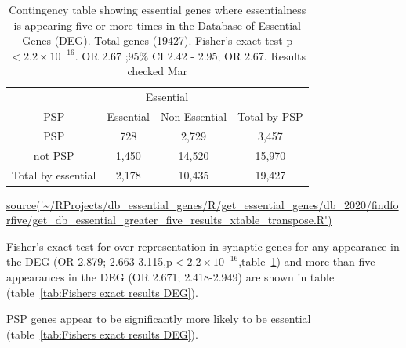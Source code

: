    \begin{table}
\centering
\begin{tabular}{cccc}
\toprule
& \multicolumn{2}{c}{Essential} & \\
\cmidrule{2-3}
    PSP & Essential &  Non-Essential & Total by PSP\vspace{1mm} \\
\midrule 
PSP      &   728     &     2,729 & 3,457\vspace{1mm}\\
not PSP    &  1,450      &    14,520  & 15,970\vspace{1mm}\\
\midrule
 Total by essential & 2,178 & 10,435 &  19,427\\ 

 
\bottomrule
\end{tabular}
\caption{Contingency table showing essential genes where essentialness is appearing five or more times  in the Database of Essential Genes (DEG). Total genes (19427).  Fisher's exact test p$<2.2\times10^{-16}$. OR 2.67 ;95\% CI 2.42 - 2.95; OR 2.67. Results checked Mar}
\tiny\url{source('~/RProjects/db_essential_genes/R/get_essential_genes/db_2020/findforfive/get_db_essential_greater_five_results_xtable_transpose.R')}  
\label{tab:DEG five or more appearances in contingency table PSP vs not PSP}
\end{table}
    
Fisher's exact test  for over representation in synaptic genes for any appearance in the DEG (OR 2.879; 2.663-3.115,p$<2.2\times10^{-16}$,table~\ref{tab:DEG five or more appearances in contingency table PSP vs not PSP}) and more than five appearances in the DEG (OR 2.671; 2.418-2.949) are shown in table (table~\ref{tab:Fishers exact results DEG}).

PSP genes appear to be significantly more likely to be essential (table~\ref{tab:Fishers exact results DEG}).

